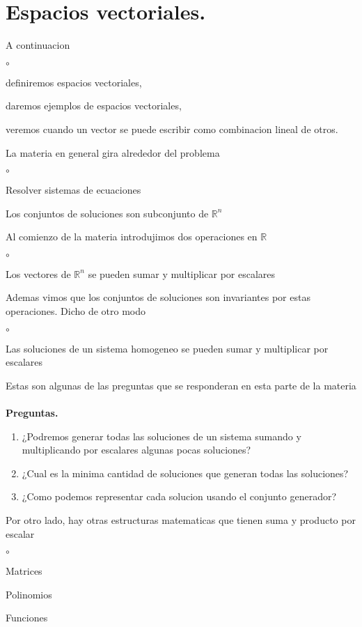 \documentclass{article}
\theoremstyle{definition}
\theoremstyle{definition}
\theoremstyle{remark}
\begin{document}
\section{Espacios vectoriales.}
A continuacion 
\begin{list}{$\circ$}{}  
\item definiremos espacios vectoriales,
\item daremos ejemplos de espacios vectoriales,
\item veremos cuando un vector se puede escribir como combinacion lineal de otros.
\end{list}
La materia en general gira alrededor del problema \begin{list}{$\circ$}{}  
\item  Resolver sistemas de ecuaciones 
\item Los conjuntos de soluciones son subconjunto de $\mathbb{R}^n$
\end{list}
Al comienzo de la materia introdujimos dos operaciones en $\mathbb{R}$
\begin{list}{$\circ$}{}  
\item Los vectores de $\mathbb{R}^n$ se pueden sumar y multiplicar por escalares
\end{list}
Ademas vimos que los conjuntos de soluciones son invariantes por estas operaciones. Dicho de otro modo 
\begin{list}{$\circ$}{}  
\item Las soluciones de un sistema homogeneo se pueden sumar y multiplicar por escalares
\end{list}
Estas son algunas de las preguntas que se responderan en esta parte de la materia\\\\
\textbf{Preguntas.}
\begin{enumerate}[label=\arabic*.]
  \item ¿Podremos generar todas las soluciones de un sistema sumando y multiplicando por escalares algunas pocas soluciones? 

  \item ¿Cual es la minima cantidad de soluciones que generan todas las soluciones? 
  \item ¿Como podemos representar cada solucion usando el conjunto generador?
\end{enumerate} 
Por otro lado, hay otras estructuras matematicas que tienen suma y producto por escalar 
\begin{list}{$\circ$}{}  
\item Matrices 
\item Polinomios 
\item Funciones
\end{list}
\pagebreak
\end{document}
